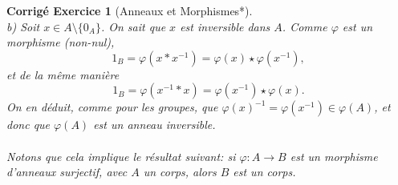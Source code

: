 \documentclass[11pt,french,table]{article}
\theoremstyle{exercice}
\theoremstyle{corrigé}
\newtheorem{corrigé}{Corrigé Exercice}
\begin{document}
\begin{corrigé}[Anneaux et Morphismes*]
\\
b) Soit $x \in A \setminus \{0_A\}$. On sait que $x$ est inversible dans $A$. Comme $\varphi$ est un morphisme (non-nul),
$$1_B = \varphi(x * x^{-1}) = \varphi(x) \star \varphi(x^{-1}),$$
et de la même manière $$1_B = \varphi(x^{-1} * x) = \varphi(x^{-1}) \star \varphi(x).$$
On en déduit, comme pour les groupes, que $\varphi(x)^{-1} = \varphi(x^{-1}) \in \varphi(A)$, et donc que $\varphi(A)$ est un anneau inversible. \\
\\
Notons que cela implique le résultat suivant: si $\varphi: A \longrightarrow B$ est un morphisme d'anneaux surjectif, avec $A$ un corps, alors $B$ est un corps.
\end{corrigé}
\vspace{2em}
\end{document}
